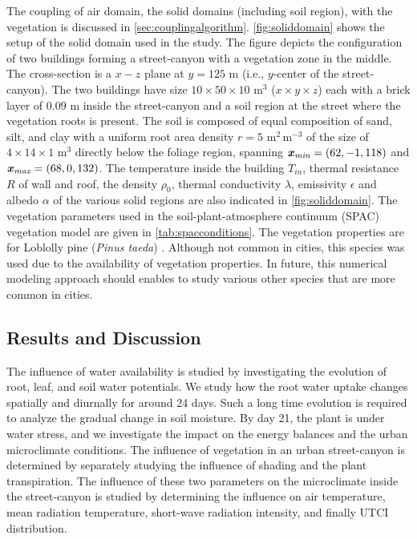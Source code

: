 The coupling of air domain, the solid domains (including soil region), with the vegetation is discussed in \cref{sec:couplingalgorithm}. \cref{fig:soliddomain} shows the setup of the solid domain used in the study. The figure depicts the configuration of two buildings forming a street-canyon with a vegetation zone in the middle. The cross-section is a $x-z$ plane at $y=125$ m  (i.e., $y$-center of the street-canyon). The two buildings have size $10 \times 50 \times 10$ m$^3$ ($x\times y \times z$) each with a brick layer of $0.09$ m inside the street-canyon and a soil region at the street where the vegetation roots is present. The soil is composed of equal composition of sand, silt, and clay with a uniform root area density $r = 5$ m$^{2}$\,m$^{-3}$ of the size of $4 \times 14 \times 1$ m$^{3}$ directly below the foliage region, spanning $\textbf{\textit{x}}_{\textit{min}} = (62, -1, 118)$ and $\textbf{\textit{x}}_{\textit{max}} = (68, 0, 132)$. The temperature inside the building $T_{\textit{in}}$, thermal resistance $R$ of wall and roof, the density $\rho_0$, thermal conductivity $\lambda$, emissivity $\epsilon$ and albedo $\alpha$ of the various solid regions are also indicated in \cref{fig:soliddomain}. The vegetation parameters used in the soil-plant-atmosphere continuum (SPAC) vegetation model are given in \cref{tab:spacconditions}. The vegetation properties are for Loblolly pine (\textit{Pinus taeda}) \citep{Manoli2014,Volpe2013,Launiainen2015,Manzoni2011,Vogel2016}. Although not common in cities, this species was used due to the availability of vegetation properties. In future, this numerical modeling approach should enables to study various other species that are more common in cities.

\subsection{Results and Discussion}


The influence of water availability is studied by investigating the evolution of root, leaf, and soil water potentials. We study how the root water uptake changes spatially and diurnally for around 24 days. Such a long time evolution is required to analyze the gradual change in soil moisture. By day 21, the plant is under water stress, and we investigate the impact on the energy balances and the urban microclimate conditions. The influence of vegetation in an urban street-canyon is determined by separately studying the influence of shading and the plant transpiration. The influence of these two parameters on the microclimate inside the street-canyon is studied by determining the influence on air temperature, mean radiation temperature, short-wave radiation intensity, and finally UTCI distribution. 

